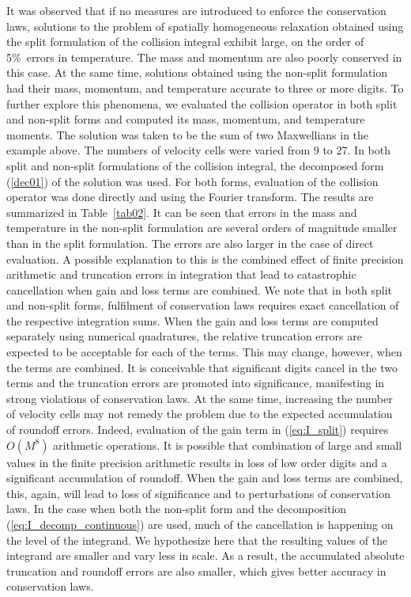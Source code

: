 \documentclass[12pt]{CSUNthesis}
\begin{document}
It was observed that if no measures are introduced to enforce the conservation laws,  
solutions to the problem of spatially homogeneous relaxation obtained using the 
split formulation of the collision integral exhibit large, on the order of 5\%\ errors in 
temperature. The mass and momentum are also poorly conserved in this case. 
At the same time, solutions obtained using the non-split formulation had their mass, momentum,
and temperature accurate to three or more digits. To further explore this phenomena, 
we evaluated the collision operator in both split and non-split forms and computed its mass, 
momentum, and temperature moments. The solution was taken to be the sum of two Maxwellians 
in the example above. The numbers of velocity cells were 
varied from 9 to 27. In both split and non-split 
formulations of the collision integral, the decomposed form (\ref{dec01}) of the solution was 
used. For both forms, evaluation of the collision operator was done directly and using the Fourier transform. 
The results are summarized in Table~\ref{tab02}. It can be seen that errors in the mass and 
temperature in the non-split formulation are several orders of magnitude smaller than in 
the split formulation. The errors are also larger in the case of direct evaluation. 
A possible explanation to this is the combined effect of finite precision 
arithmetic and truncation errors in integration that lead to catastrophic cancellation 
when gain and loss terms are combined. 
We note that in 
both split and non-split forms, fulfilment of 
conservation laws requires exact cancellation of the respective integration 
sums. 
When the gain and
loss terms are computed separately using numerical quadratures, the 
relative truncation errors are expected to be acceptable for each of the terms. 
This may change, however, when the terms are combined. It is 
conceivable that significant digits cancel in the two terms and the 
truncation errors are promoted into significance, manifesting in strong 
violations of conservation laws. At the same time, increasing 
the number of velocity cells may not remedy the problem 
due to the expected accumulation of roundoff 
errors. Indeed, evaluation of the gain term in (\ref{eq:I_split}) requires 
$O(M^8)$ arithmetic operations. 
It is possible that combination of large and small values in the finite 
precision arithmetic results in loss of low order digits and a significant 
accumulation of roundoff. When the gain and loss terms are combined, 
this, again, will lead to loss of significance and to perturbations of 
conservation laws. In the case when both the  
non-split form and the decomposition (\ref{eq:I_decomp_continuous}) are used, 
much of the cancellation is happening 
on the level of the integrand. 
We hypothesize here 
that the resulting values of the integrand are smaller and vary less 
in scale. As a result, the accumulated absolute truncation and 
roundoff errors are also smaller, which gives better accuracy in 
conservation laws.
\end{document}
